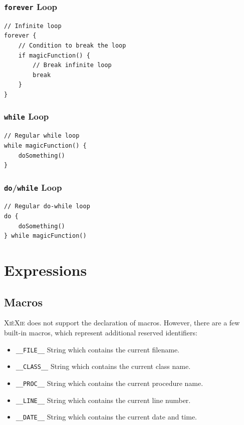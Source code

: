 \documentclass{report}
\def\xiexie{\textsc{Xi\`eXie}\xspace}
\begin{document}
\subsubsection{\texttt{forever} Loop}

\begin{lstlisting}
// Infinite loop
forever {
    // Condition to break the loop
    if magicFunction() {
        // Break infinite loop
        break
    }
}
\end{lstlisting}

\subsubsection{\texttt{while} Loop}

\begin{lstlisting}
// Regular while loop
while magicFunction() {
    doSomething()
}
\end{lstlisting}

\subsubsection{\texttt{do}/\texttt{while} Loop}

\begin{lstlisting}
// Regular do-while loop
do {
    doSomething()
} while magicFunction()
\end{lstlisting}



\section{Expressions}

\subsection{Macros}

\xiexie does not support the declaration of macros. However, there are a few built-in macros, which represent additional
reserved identifiers:
\begin{itemize}
	\item \texttt{\_\_FILE\_\_} String which contains the current filename.
	\item \texttt{\_\_CLASS\_\_} String which contains the current class name.
	\item \texttt{\_\_PROC\_\_} String which contains the current procedure name.
	\item \texttt{\_\_LINE\_\_} String which contains the current line number.
	\item \texttt{\_\_DATE\_\_} String which contains the current date and time.
\end{itemize}
\end{document}
